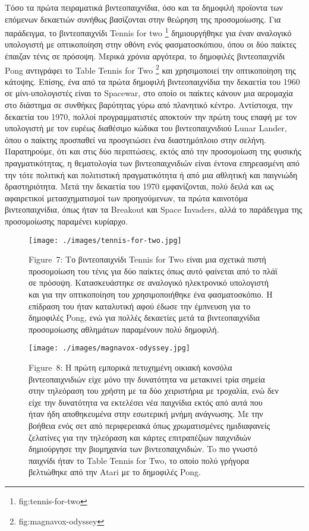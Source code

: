 \documentclass[
]{article}
\begin{document}
Τόσο τα πρώτα πειραματικά βιντεοπαιχνίδια, όσο και τα δημοφιλή προϊοντα
των επόμενων δεκαετιών συνήθως βασίζονται στην θεώρηση της προσομοίωσης.
Για παράδειγμα, το βιντεοπαιχνίδι Tennis for two \footnote{fig:tennis-for-two}
δημιουργήθηκε για έναν αναλογικό υπολογιστή με οπτικοποίηση στην οθόνη
ενός φασματοσκόπιου, όπου οι δύο παίκτες έπαιζαν τένις σε πρόσοψη.
Μερικά χρόνια αργότερα, το δημοφιλές βιντεοπαιχνίδι Pong αντιγράφει το
Table Tennis for Two \footnote{fig:magnavox-odyssey} και χρησιμοποιεί
την οπτικοποίηση της κάτοψης. Επίσης, ένα από τα πρώτα δημοφιλή
βιντεοπαιχνίδια την δεκαετία του 1960 σε μίνι-υπολογιστές είναι το
Spacewar, στο οποίο οι παίκτες κάνουν μια αερομαχία στο διάστημα σε
συνθήκες βαρύτητας γύρω από πλανητικό κέντρο. Αντίστοιχα, την δεκαετία
του 1970, πολλοί προγραμματιστές αποκτούν την πρώτη τους επαφή με τον
υπολογιστή με τον ευρέως διαθέσιμο κώδικα του βιντεοπαιχνιδιού Lunar
Lander, όπου ο παίκτης προσπαθεί να προσγειώσει ένα διαστημόπλοιο στην
σελήνη. Παρατηρούμε, ότι και στις δύο περιπτώσεις, εκτός από την
προσομοίωση της φυσικής πραγματικότητας, η θεματολογία των
βιντεοπαιχνιδιών είναι έντονα επηρεασμένη από την τότε πολιτική και
πολιτιστική πραγματικότητα ή από μια αθλητική και παιγνιώδη
δραστηριότητα. Μετά την δεκαετία του 1970 εμφανίζονται, πολύ δειλά και
ως αφαιρετικοί μετασχηματισμοί των προηγούμενων, τα πρώτα καινοτόμα
βιντεοπαιχνίδια, όπως ήταν τα Breakout και Space Invaders, αλλά το
παράδειγμα της προσομοίωσης παραμένει κυρίαρχο.

\leavevmode{}%
\begin{figure}
\hypertarget{fig:tennis-for-two}{%
\centering
\texttt{[image: ./images/tennis-for-two.jpg]}
\caption{Figure~7: Το βιντεοπαιχνίδι Tennis for Two είναι μια σχετικά
πιστή προσομοίωση του τένις για δύο παίκτες όπως αυτό φαίνεται από το
πλάϊ σε πρόσοψη. Κατασκευάστηκε σε αναλογικό ηλεκτρονικό υπολογιστή και
για την οπτικοποίηση του χρησιμοποιήθηκε ένα φασματοσκόπιο. Η επίδραση
του ήταν καταλυτική αφού έδωσε την έμπνευση για το δημοφιλές Pong, ενώ
για πολλές δεκαετίες μετά τα βιντεοπαιχνίδια προσομοίωσης αθλημάτων
παραμένουν πολύ δημοφιλή.}\label{fig:tennis-for-two}
}
\end{figure}

\leavevmode{}%
\begin{figure}
\hypertarget{fig:magnavox-odyssey}{%
\centering
\texttt{[image: ./images/magnavox-odyssey.jpg]}
\caption{Figure~8: Η πρώτη εμπορικά πετυχημένη οικιακή κονσόλα
βιντεοπαιχνιδιών είχε μόνο την δυνατότητα να μετακινεί τρία σημεία στην
τηλεόραση του χρήστη με τα δύο χειριστήρια με τροχαλία, ενώ δεν είχε την
δυνατότητα να εκτελέσει νέα παιχνίδια εκτός από αυτά που ήταν ήδη
αποθηκευμένα στην εσωτερική μνήμη ανάγνωσης. Με την βοήθεια ενός σετ από
περιφερειακά όπως χρωματισμένες ημιδιαφανείς ζελατίνες για την τηλεόραση
και κάρτες επιτραπέζιων παιχνιδιών δημιούργησε την βιομηχανία των
βιντεοπαιχνιδιών. To πιο γνωστό παιχνίδι ήταν το Table Tennis for Two,
το οποίο πολύ γρήγορα βελτιώθηκε από την Atari με το δημοφιλές
Pong.}\label{fig:magnavox-odyssey}
}
\end{figure}
\end{document}
